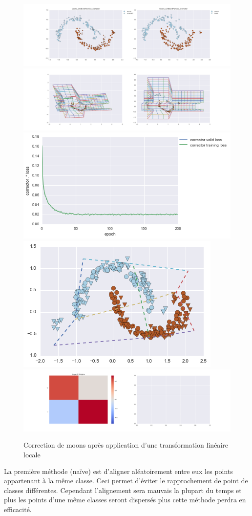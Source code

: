 \begin{figure}[H] %
\centering
\includegraphics[width=\linewidth]{fig/24-05-2016/moons/Moons_GridBendPairwise_Corrector-DATA.png}
\includegraphics[width=\linewidth]{fig/24-05-2016/moons/Moons_GridBendPairwise_Corrector-GridCheck.png}
\includegraphics[width=0.45\linewidth]{fig/24-05-2016/moons/Moons_GridBendPairwise_Corrector-Learning_curve.png}
\includegraphics[width=0.45\linewidth]{fig/24-05-2016/moons/moons_grid.png}
\includegraphics[width=\linewidth]{fig/24-05-2016/moons/Moons_GridBendPairwise_Corrector-W.png}
\caption{Correction de moons après application d'une transformation linéaire locale}
\label{fig:recap-moons-GridBend-pairwise}
\end{figure}
La première méthode (naïve) est d'aligner aléatoirement entre eux les points appartenant à la même classe.
Ceci permet d'éviter le rapprochement de point de classes différentes. Cependant l'alignement sera mauvais
la plupart du temps et plus les points d'une même classes seront dispersés plus cette méthode perdra en efficacité.

